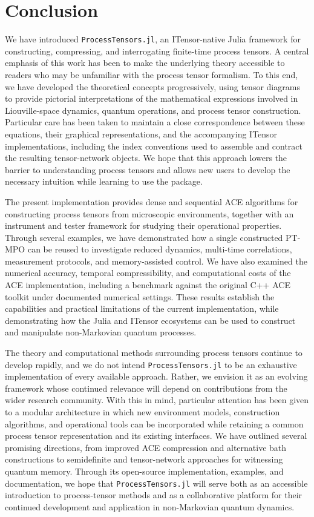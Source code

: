 \section{Conclusion}
\label{sec:conclusion}

We have introduced \texttt{ProcessTensors.jl}, an ITensor-native Julia framework for constructing, compressing, and interrogating finite-time process tensors.
A central emphasis of this work has been to make the underlying theory accessible to readers who may be unfamiliar with the process tensor formalism.
To this end, we have developed the theoretical concepts progressively, using tensor diagrams to provide pictorial interpretations of the mathematical expressions involved in Liouville-space dynamics, quantum operations, and process tensor construction.
Particular care has been taken to maintain a close correspondence between these equations, their graphical representations, and the accompanying ITensor implementations, including the index conventions used to assemble and contract the resulting tensor-network objects.
We hope that this approach lowers the barrier to understanding process tensors and allows new users to develop the necessary intuition while learning to use the package.

The present implementation provides dense and sequential ACE algorithms for constructing process tensors from microscopic environments, together with an instrument and tester framework for studying their operational properties.
Through several examples, we have demonstrated how a single constructed PT-MPO can be reused to investigate reduced dynamics, multi-time correlations, measurement protocols, and memory-assisted control.
We have also examined the numerical accuracy, temporal compressibility, and computational costs of the ACE implementation, including a benchmark against the original C++ ACE toolkit under documented numerical settings.
These results establish the capabilities and practical limitations of the current implementation, while demonstrating how the Julia and ITensor ecosystems can be used to construct and manipulate non-Markovian quantum processes.

The theory and computational methods surrounding process tensors continue to develop rapidly, and we do not intend \texttt{ProcessTensors.jl} to be an exhaustive implementation of every available approach.
Rather, we envision it as an evolving framework whose continued relevance will depend on contributions from the wider research community.
With this in mind, particular attention has been given to a modular architecture in which new environment models, construction algorithms, and operational tools can be incorporated while retaining a common process tensor representation and its existing interfaces.
We have outlined several promising directions, from improved ACE compression and alternative bath constructions to semidefinite and tensor-network approaches for witnessing quantum memory.
Through its open-source implementation, examples, and documentation, we hope that \texttt{ProcessTensors.jl} will serve both as an accessible introduction to process-tensor methods and as a collaborative platform for their continued development and application in non-Markovian quantum dynamics.
